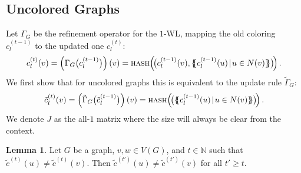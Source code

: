 \documentclass[letterpaper]{article}
\theoremstyle{definition}
\newtheorem{lemma}[theorem]{Lemma}
\newcommand{\NN}{\mathbb{N}}
\newcommand{\oms}{\{\!\!\{}
\newcommand{\cms}{\}\!\!\}}
\begin{document}
\subsection{Uncolored Graphs}
Let $\Gamma_G$ be the refinement operator for the $1$-WL, mapping the old coloring $c_{l}^{(t-1)}$ to the updated one $c_{l}^{(t)}$:
\begin{equation*}\label{eq:wlColoring}
	c_{l}^{(t)}(v) = \left(\Gamma_G\big(c_{l}^{(t-1)}\big)\right)(v)= \textsc{hash}\Big(\! \big(c_l^{(t-1)}(v),\oms c_l^{(t-1)}(u)\!\mid\!u \in N(v) \cms \big)\! \Big)\,.
\end{equation*}
We first show that for uncolored graphs this is equivalent to the update rule $\tilde\Gamma_G$:
\begin{equation*}\label{eq:wlColoring}
	\tilde c_{l}^{(t)}(v) = \left(\tilde\Gamma_G\big(\tilde c_{l}^{(t-1)}\big)\right)(v)= \textsc{hash}\Big(\! \big(\oms c_l^{(t-1)}(u)\!\mid\!u \in N(v) \cms \big)\! \Big)\,.
\end{equation*}
We denote $J$ as the all-$1$ matrix where the size will always be clear from the context.

\begin{lemma}\label{lem:1}
	Let $G$ be a graph, $v,w\in V(G)$, and $t\in\NN$ such that
	$\tilde c^{(t)}(u) \neq \tilde c^{(t)}(v)$.
	Then $\tilde c^{(t')}(u) \neq \tilde c^{(t')}(v)$ for all $t'\geq t$.
\end{lemma}
\end{document}
